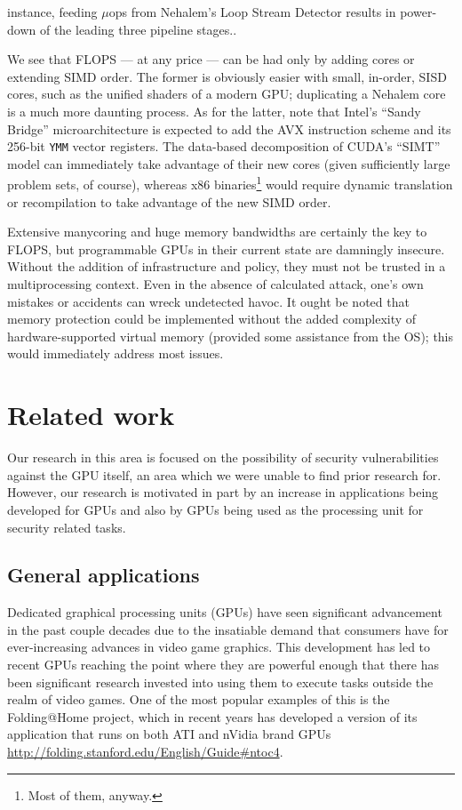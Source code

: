 \documentclass[letterpaper,10pt]{article}
\begin{document}
\begin{multicols}{2}
\begin{itemize}
{instance, feeding $\mu$ops from Nehalem's Loop Stream Detector results in power-down
of the leading three pipeline stages.}.
\end{itemize}
We see that FLOPS --- at any price --- can be had only by adding cores or extending
SIMD order. The former is obviously easier with small, in-order, SISD cores,
such as the unified shaders of a modern GPU; duplicating a Nehalem core is a
much more daunting process. As for the latter, note that Intel's ``Sandy
Bridge'' microarchitecture is expected to add the AVX instruction scheme and
its 256-bit \texttt{YMM} vector registers\cite{avx}. The data-based decomposition of CUDA's
``SIMT'' model can immediately take advantage of their new cores (given
sufficiently large problem sets, of course), whereas x86 binaries\footnote{Most of them, anyway.} would
require dynamic translation or recompilation to take advantage of the new SIMD
order.

Extensive manycoring and huge memory bandwidths are certainly the key to FLOPS,
but programmable GPUs in their current state are damningly insecure. Without the
addition of infrastructure and policy, they must not be trusted in a
multiprocessing context. Even in the absence of calculated attack, one's own
mistakes or accidents can wreck undetected havoc. It ought be noted that memory
protection could be implemented without the added complexity of
hardware-supported virtual memory (provided some assistance from the OS); this
would immediately address most issues.

\section{Related work}
Our research in this area is focused on the possibility of security
vulnerabilities against the GPU itself, an area which we were unable to find
prior research for. However, our research is motivated in part by an increase
in applications being developed for GPUs and also by GPUs being used as the
processing unit for security related tasks.
  
\subsection{General applications}
  
  Dedicated graphical processing units (GPUs) have seen significant advancement
in the past couple decades due to the insatiable demand that consumers have for
ever-increasing advances in video game graphics. This development has led to
recent GPUs reaching the point where they are powerful enough that there has
been significant research invested into using them to execute tasks outside the
realm of video games. One of the most popular examples of this is the
Folding@Home project, which in recent years has developed a version of its
application that runs on both ATI and nVidia brand GPUs
\url{http://folding.stanford.edu/English/Guide#ntoc4}.
  

\end{multicols}
\end{document}
